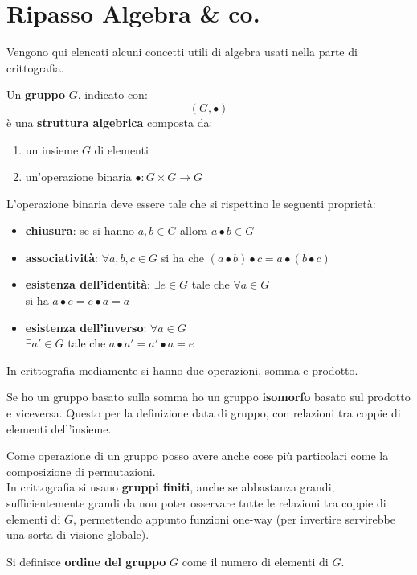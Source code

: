 \documentclass[a4paper,12pt, oneside]{book}
\begin{document}
\chapter{Ripasso Algebra \& co.}
Vengono qui elencati alcuni concetti utili di algebra usati nella parte di
crittografia.
\begin{definizione}
  Un \textbf{gruppo} $G$, indicato con:
  \[(G,\bullet)\]
  è una \textbf{struttura algebrica} composta da:
  \begin{enumerate}
    \item un insieme $G$ di elementi
    \item un'operazione binaria $\bullet:G\times G\to G$
  \end{enumerate}
  L'operazione binaria deve essere tale che si rispettino le seguenti
  proprietà: 
  \begin{itemize}
    \item \textbf{chiusura}: se si hanno $a,b\in G$ allora $a\bullet b\in G$
    \item \textbf{associatività}: $\forall a,b,c\in G$ si ha che $(a\bullet
    b) \bullet c= a\bullet (b\bullet c)$
    \item \textbf{esistenza dell'identità}: $\exists e\in G$ tale che
    $\forall a \in G$ \\si ha $a\bullet e = e \bullet a = a $
    \item \textbf{esistenza dell'inverso}: $\forall a\in G$\\ $\exists a'\in
    G$ tale che $a\bullet a'=a'\bullet a=e$
  \end{itemize}
\end{definizione}
In crittografia mediamente si hanno due operazioni, somma e prodotto.
\begin{teorema}
  Se ho un gruppo basato sulla somma ho un gruppo \textbf{isomorfo} basato sul
  prodotto e viceversa. Questo per la definizione data di gruppo, con
  relazioni tra coppie di elementi dell'insieme.
\end{teorema}
Come operazione di un gruppo posso avere anche cose più particolari come la
composizione di permutazioni.\\
In crittografia si usano \textbf{gruppi finiti}, anche se abbastanza grandi,
sufficientemente grandi da non poter osservare tutte le relazioni tra coppie
di elementi di $G$, permettendo appunto funzioni one-way (per invertire
servirebbe una sorta di visione globale).
\begin{definizione}
  Si definisce \textbf{ordine del gruppo} $G$ come il numero di elementi di
  $G$. 
\end{definizione}
\end{document}
